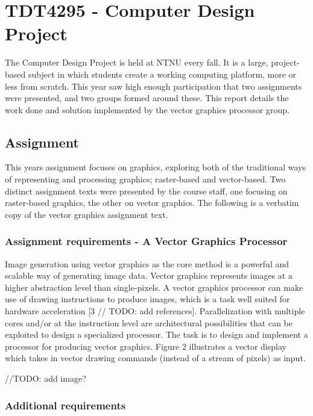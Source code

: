 \chapter{TDT4295 - Computer Design Project}

The Computer Design Project is held at NTNU every fall.
It is a large, project-based subject in which students create a working computing platform, more or less from scratch.
This year saw high enough participation that two assignments were presented, and two groups formed around these.
This report details the work done and solution implemented by the vector graphics processor group.

\section{Assignment}

This years assignment focuses on graphics, exploring both of the traditional ways of representing and processing graphics; raster-based and vector-based.
Two distinct assignment texts were presented by the course staff, one focusing on raster-based graphics, the other on vector graphics.
The following is a verbatim copy of the vector graphics assignment text.

\subsection{Assignment requirements - A Vector Graphics Processor}

Image generation using vector graphics as the core method is a powerful and scalable way of generating image data.
Vector graphics represents images at a higher abstraction level than single-pixels.
A vector graphics processor can make use of drawing instructions to produce images, which is a task well suited for hardware acceleration [3 // TODO: add references].
Parallelization with multiple cores and/or at the instruction level are architectural possibilities that can be exploited to design a specialized processor.
The task is to design and implement a processor for producing vector graphics.
Figure 2 illustrates a vector display which takes in vector drawing commands (instead of a stream of pixels) as input.

//TODO: add image?

\subsection{Additional requirements}

